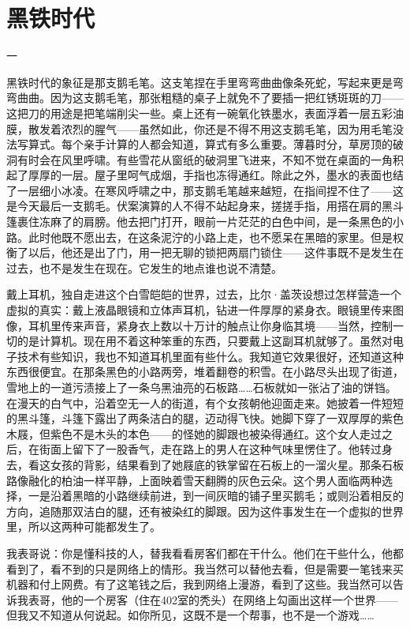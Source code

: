 \chapter{黑铁时代}

一 

黑铁时代的象征是那支鹅毛笔。这支笔捏在手里弯弯曲曲像条死蛇，写起来更是弯弯曲曲。因为这支鹅毛笔，那张粗糙的桌子上就免不了要插一把红锈斑斑的刀——这把刀的用途是把笔端削尖一些。桌上还有一碗氧化铁墨水，表面浮着一层五彩油膜，散发着浓烈的腥气——虽然如此，你还是不得不用这支鹅毛笔，因为用毛笔没法写算式。每个亲手计算的人都会知道，算式有多么重要。薄暮时分，草房顶的破洞有时会在风里呼啸。有些雪花从窗纸的破洞里飞进来，不知不觉在桌面的一角积起了厚厚的一层。屋子里呵气成烟，手指也冻得通红。除此之外，墨水的表面也结了一层细小冰凌。在寒风呼啸之中，那支鹅毛笔越来越短，在指间捏不住了——这是今天最后一支鹅毛。伏案演算的人不得不站起身来，搓搓手指，用搭在肩的黑斗篷裹住冻麻了的肩膀。他去把门打开，眼前一片茫茫的白色中间，是一条黑色的小路。此时他既不愿出去，在这条泥泞的小路上走，也不愿呆在黑暗的家里。但是权衡了以后，他还是出了门，用一把无聊的锁把两扇门锁住——这件事既不是发生在过去，也不是发生在现在。它发生的地点谁也说不清楚。 

戴上耳机，独自走进这个白雪皑皑的世界，过去，比尔·盖茨设想过怎样营造一个虚拟的真实：戴上液晶眼镜和立体声耳机，钻进一件厚厚的紧身衣。眼镜里传来图像，耳机里传来声音，紧身衣上数以十万计的触点让你身临其境——当然，控制一切的是计算机。现在用不着这种笨重的东西，只要戴上这副耳机就够了。虽然对电子技术有些知识，我也不知道耳机里面有些什么。我知道它效果很好，还知道这种东西很便宜。在那条黑色的小路两旁，堆着翻卷的积雪。在小路尽头出现了街道，雪地上的一道污渍接上了一条乌黑油亮的石板路……石板就如一张沾了油的饼铛。在漫天的白气中，沿着空无一人的街道，有个女孩朝他迎面走来。她披着一件短短的黑斗篷，斗篷下露出了两条洁白的腿，迈动得飞快。她脚下穿了一双厚厚的紫色木屐，但紫色不是木头的本色——的怪她的脚跟也被染得通红。这个女人走过之后，在街面上留下了一股香气，走在路上的男人在这种气味里愣住了。他转过身去，看这女孩的背影，结果看到了她屐底的铁掌留在石板上的一溜火星。那条石板路像融化的柏油一样平静，上面映着雪天翻腾的灰色云朵。这个男人面临两种选择，一是沿着黑暗的小路继续前进，到一间灰暗的铺子里买鹅毛；或则沿着相反的方向，追随那双洁白的腿，还有被染红的脚跟。因为这件事发生在一个虚拟的世界里，所以这两种可能都发生了。 



我表哥说：你是懂科技的人，替我看看房客们都在干什么。他们在干些什么，他都看到了，看不到的只是网络上的情形。我当然可以替他去看，但是需要一笔钱来买机器和付上网费。有了这笔钱之后，我到网络上漫游，看到了这些。我当然可以告诉我表哥，他的一个房客（住在402室的秃头）在网络上勾画出这样一个世界——但我又不知道从何说起。如你所见，这既不是一个帮事，也不是一个游戏…… 

